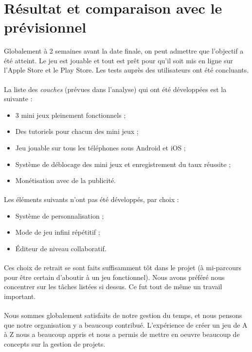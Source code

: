 \section{Résultat et comparaison avec le prévisionnel}

\paragraph{}
Globalement à 2 semaines avant la date finale, on peut admettre que l'objectif a été atteint. 
Le jeu est jouable et tout est prêt pour qu'il soit mis en ligne sur l'Apple Store et le Play Store. Les tests auprès des utilisateurs ont été concluants.

\paragraph{}
La liste des \textit{couches} (prévues dans l'analyse) qui ont été développées est la suivante :
\begin{itemize}
\item 3 mini jeux pleinement fonctionnels ;
\item Des tutoriels pour chacun des mini jeux ;
\item Jeu jouable sur tous les téléphones sous Android et iOS ;
\item Système de déblocage des mini jeux et enregistrement du taux réussite ;
\item Monétisation avec de la publicité.
\end{itemize}

\paragraph{}
Les éléments suivants n'ont pas été développés, par choix :
\begin{itemize}
\item Système de personnalisation ;
\item Mode de jeu infini répétitif ;
\item Éditeur de niveau collaboratif.
\end{itemize}

\paragraph{}
Ces choix de retrait se sont faits suffisamment tôt dans le projet (à mi-parcours pour être certain d'aboutir à un jeu fonctionnel). Nous avons préféré nous concentrer sur les tâches listées si dessus. Ce fut tout de même un travail important.

\paragraph{}
Nous sommes globalement satisfaits de notre gestion du temps, et nous pensons que notre organisation y a beaucoup contribué.
L'expérience de créer un jeu de A à Z nous a beaucoup appris et nous a permis de mettre en oeuvre beaucoup de concepts sur la gestion de projets.



